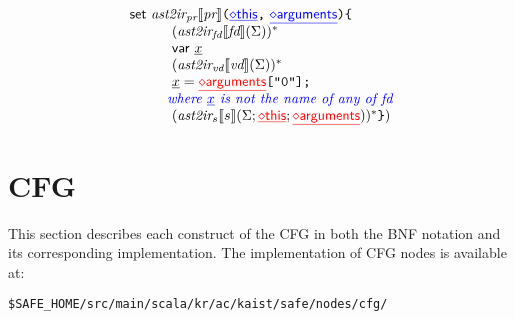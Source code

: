 \[\begin{array}{l@{~}l@{~}l}
{\sf set} \ \atoiPRfd{\prop} \verb+(+{\inblue\newvar{this}}\verb+,+\ {\inblue\newvar{arguments}}\verb+)+
\verb+{+\\
\quad\quad\quad(\atoiFDfd{\fd})^*\\
\quad\quad\quad{\sf var}\ \ir{x}\\
\quad\quad\quad(\atoiVDf{\vd}\env)^*\\
\quad\quad\quad
\ir{x} = {\inred\newvar{arguments}}\verb+["0"];+\\
\quad\quad\note{where \ir{x} is not the name of any of \mbox{fd}}\\
\quad\quad\quad(\atoiSf{\stmt}{\env; {\inred\newvar{this}}; {\inred\newvar{arguments}}})^*
\verb+}+
)
\end{array}
\]

\section{CFG}
This section describes each construct of the \safe CFG
in both the BNF notation and its corresponding implementation.
The implementation of CFG nodes is available at:
\begin{verbatim}
$SAFE_HOME/src/main/scala/kr/ac/kaist/safe/nodes/cfg/
\end{verbatim}

